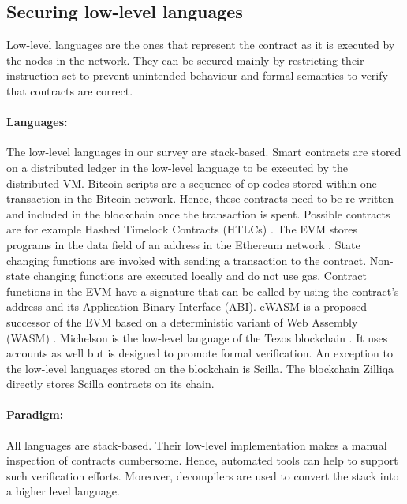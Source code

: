\documentclass{llncs}
\begin{document}
\subsection{Securing low-level languages}
Low-level languages are the ones that represent the contract as it is executed by the nodes in the network.
They can be secured mainly by restricting their instruction set to prevent unintended behaviour and formal semantics to verify that contracts are correct.

\paragraph{Languages:}
The low-level languages in our survey are stack-based. Smart contracts are stored on a distributed ledger in the low-level language to be executed by the distributed VM.
Bitcoin scripts are a sequence of op-codes stored within one transaction in the Bitcoin network\cite{BitcoinWiki2018Script}. Hence, these contracts need to be re-written and included in the blockchain once the transaction is spent. Possible contracts are for example Hashed Timelock Contracts (HTLCs) \cite{BitcoinWiki2018HTLC}.
The EVM stores programs in the data field of an address in the Ethereum network \cite{Wood2014}. State changing functions are invoked with sending a transaction to the contract. Non-state changing functions are executed locally and do not use gas. Contract functions in the EVM have a signature that can be called by using the contract's address and its Application Binary Interface (ABI).
eWASM is a proposed successor of the EVM based on a deterministic variant of Web Assembly (WASM) \cite{Wanderer2015,EthereumFoundation2018ewasm}.
Michelson is the low-level language of the Tezos blockchain \cite{DynamicLedgerSolutions2017}. It uses accounts as well but is designed to promote formal verification.
An exception to the low-level languages stored on the blockchain is Scilla. The blockchain Zilliqa directly stores Scilla contracts on its chain.

\paragraph{Paradigm:} All languages are stack-based. Their low-level implementation makes a manual inspection of contracts cumbersome. Hence, automated tools can help to support such verification efforts. Moreover, decompilers are used to convert the stack into a higher level language.
\end{document}
